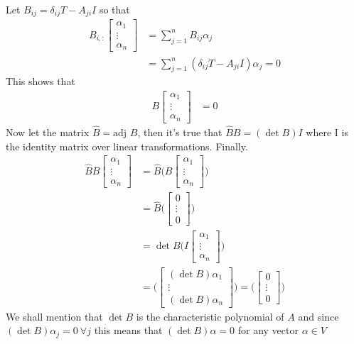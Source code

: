 \documentclass[../main.tex]{subfiles}
\begin{document}
Let $B_{ij}= \delta_{ij}T-A_{ji}I$ so that
\begin{align*}
    B_{i,:}\begin{bmatrix}
        \alpha_1\\ \vdots \\ \alpha_n
    \end{bmatrix}
    &= \sum_{j=1}^n B_{ij}\alpha_j\\
    &= \sum_{j=1}^n (\delta_{ij}T-A_{ji}I)\alpha_j=0
\end{align*}
This shows that
\begin{align*}
    B\begin{bmatrix}
        \alpha_1\\ \vdots \\ \alpha_n
    \end{bmatrix}
    &=0
\end{align*}
Now let the matrix $\hat{B}=\text{adj }B$, then it's true that $\hat{B}B = (\det B)I$
where I is the identity matrix over linear transformations. Finally.
\begin{align*}
    \hat{B}B\begin{bmatrix}
        \alpha_1\\ \vdots \\ \alpha_n
    \end{bmatrix}
    &= \hat{B}\Big( B\begin{bmatrix}
        \alpha_1\\ \vdots \\ \alpha_n
    \end{bmatrix}\Big)\\
    &= \hat{B}\Big(\begin{bmatrix}
        0\\ \vdots \\ 0
    \end{bmatrix}\Big)\\
    &= \det B( I \begin{bmatrix}
        \alpha_1\\ \vdots \\ \alpha_n
    \end{bmatrix}\Big)\\
    &= (\begin{bmatrix}
        (\det B)\alpha_1\\ \vdots \\ (\det B)\alpha_n
    \end{bmatrix}\Big)= (\begin{bmatrix}
        0\\ \vdots \\ 0
    \end{bmatrix}\Big)
\end{align*}
We shall mention that $\det B$ is the characteristic polynomial of $A$ and since $(\det B)\alpha_j=0\ \forall j$ this means that $(\det B)\alpha = 0$ for any vector $\alpha\in V$
\end{document}
